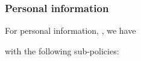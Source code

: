 \documentclass[a4paper]{article}
\begin{document}
\begin{center}
\noindent{}
\end{center} 

\subsubsection{Personal information} 

For personal information, , we have  

\begin{center}
\noindent\fbox{\parbox{5cm}{  (, , , , )     
     }
}
\end{center}  

with the following sub-policies: 
\end{document}
